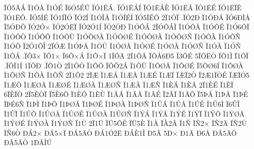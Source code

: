 {^^cf^^d35^^c2^^c1
^^cf1^^d3^^c5
^^cf1^^d3^^c9
^^cf6^^d35^^c9^^da
^^cf^^d31^^cb^^c1.
^^cf^^d31^^cb^^c1^^cd
^^cf^^d31^^cb^^c1^^c8
^^cf^^d31^^cb^^c5
^^cf^^d31^^cb^^c9
^^cf^^d31^^cb^^cf^^ca
^^cf^^d31^^cb^^d5.
^^cf^^d35^^cd^^c9
^^cf^^d31^^cd^^cf^^d3
^^cf^^d32^^ce
^^cf1^^d3^^ce^^c5
^^cf1^^d3^^ce^^c9^^cd
^^cf^^d35^^ce^^c9^^d4
2^^cf1^^d3^^cf
.^^cf^^d32^^d0
^^cf1^^d3^^d0^^c5
^^cf^^d36^^d0^^cc^^c5
^^cf5^^d3^^d0^^d5
^^cf^^d32^^d3^^d7
^^cf^^d32^^d3^^cb^^cf
^^cf^^d32^^d31^^cd
^^cf^^d32^^d3^^d0
^^cf1^^d3^^d4^^c1
2^^cf^^d3^^d4^^c1^^cc
^^cf1^^d3^^d4^^c5
^^cf1^^d3^^d4^^c9
^^cf1^^d36^^d4^^cf
^^cf1^^d3^^d4^^d2
^^cf1^^d3^^d4^^d5
^^cf1^^d3^^d4^^d9
^^cf1^^d3^^d4^^d8^^c5
^^cf1^^d3^^d4^^d8^^c9
^^cf1^^d3^^d4^^d8^^c0
^^cf1^^d3^^d4^^d8^^d1
^^cf1^^d3^^d4^^c0
^^cf1^^d3^^d4^^d1
^^cf1^^d3^^d5
^^cf2^^d31^^d5^^ce
2^^cf^^d3^^c6
^^cf1^^d3^^de^^c5
^^cf1^^d3^^d9
^^cf1^^d3^^d8^^c5
^^cf1^^d3^^d8^^c9
^^cf1^^d3^^d8^^c0
^^cf1^^d3^^d8^^d1
^^cf1^^d3^^c0
^^cf1^^d3^^d1
^^cf1^^d4^^c1
.^^cf^^d43^^d7
^^cf^^d41^^d7
^^cf6^^d4^^d7^^c1
^^cf1^^d4^^d7^^cf
1^^cf^^d4^^c4
2^^cf1^^d4^^c5
^^cf^^d4^^c56^^d05
^^cf3^^d4^^c9
5^^cf^^d4^^cb^^d2
^^cf^^d41^^cc
^^cf1^^d4^^cf
.^^cf^^d4^^cf1^^cd
1^^cf^^d4^^d0
.^^cf^^d41^^d2
2^^cf1^^d4^^d2
^^cf1^^d4^^d5
^^cf^^d4^^d52^^c1
^^cf1^^d4^^d9
^^cf1^^d4^^d8^^c5
^^cf1^^d4^^d8^^c9
^^cf5^^d4^^d86^^cd
^^cf1^^d4^^d8^^c0
^^cf1^^d4^^d8^^d1
^^cf1^^d4^^c0
^^cf1^^d4^^d1
2^^cf1^^d52
2^^cf^^c6
^^cf1^^c6^^c1
^^cf1^^c6^^c5
^^cf1^^c6^^c9
^^cf1^^c6^^cf
^^cf^^c6^^cf2^^d2
^^cf2^^c61^^cf^^d2^^c9
^^cf^^c6^^cf^^d35
^^cf1^^c6^^d5
^^cf1^^c6^^d8^^c5
^^cf1^^c6^^d8^^c9
^^cf1^^c6^^d8^^c0
^^cf1^^c6^^d8^^d1
^^cf1^^c6^^c0
^^cf1^^c6^^d1
^^cf1^^c8^^c1
^^cf1^^c8^^c5
2^^cf1^^c8^^c9
^^cf1^^c8^^cf
6^^cf^^c8^^cf^^d2
2^^cf5^^c8^^d2^^cf
^^cf5^^c86^^d4
^^cf1^^c8^^d5
^^cf1^^c8^^d9
^^cf1^^c3^^c1
^^cf1^^c3^^c5
^^cf1^^c3^^c9
^^cf2^^c3^^cf
^^cf1^^c3^^d5
^^cf5^^de^^c1
^^cf1^^de^^c5
^^cf1^^de^^c9
^^cf^^de^^c96^^d1
^^cf1^^de^^cc
^^cf1^^de^^d5
^^cf1^^de^^d8^^c5
^^cf1^^de^^d8^^c9
^^cf1^^de^^d8^^c0
^^cf1^^de^^d8^^d1
^^cf1^^db^^c1
^^cf1^^db^^c5
^^cf1^^db^^c9
^^cf1^^db6^^cc
^^cf6^^db^^ce
^^cf1^^db^^cf
^^cf1^^db^^d5
^^cf1^^db^^d8^^c5
^^cf1^^db^^d8^^c9
^^cf1^^db^^d8^^c0
^^cf1^^db^^d8^^d1
^^cf1^^dd^^c1
^^cf1^^dd^^c5
^^cf1^^dd^^c9
^^cf1^^dd^^cf
^^cf1^^dd^^d5
^^cf1^^dd^^d8^^c5
^^cf1^^dd^^d8^^c9
^^cf1^^dd^^d8^^c0
^^cf1^^dd^^d8^^d1
^^cf1^^d9
2^^cf1^^dc
^^cf^^dc5^^d4^^c9
^^cf^^dc5^^c8
^^cf1^^c0
^^cf^^c02^^c2
^^cf1^^d1
^^cf^^d12^^d7
^^cf^^d12^^c4
^^cf^^d12^^da
^^cf^^d16^^d2
^^d0^^c12^^d7
^^d0^^c15^^d7^^cf
^^d0^^c15^^c4^^d2
^^d0^^c11^^d32^^cb
^^d0^^c1^^c81^^cc
^^d05^^c2
5^^d0^^d7
^^d01^^c4
^^d06^^c5
^^d0^^c55^^c4^^d6
^^d0^^c55^^c4^^d2
1^^d0^^c5^^ce^^da
}
